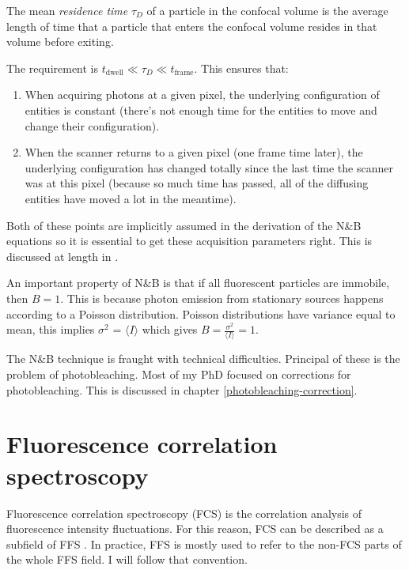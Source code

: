 \documentclass[12pt,]{book}
\providecommand{\tightlist}{%
  \setlength{\itemsep}{0pt}\setlength{\parskip}{0pt}}
\theoremstyle{definition}
\theoremstyle{definition}
\theoremstyle{definition}
\theoremstyle{remark}
\let\BeginKnitrBlock\begin \let\EndKnitrBlock\end
\begin{document}
\BeginKnitrBlock{definition}
\protect\hypertarget{def:unnamed-chunk-17}{}{\label{def:unnamed-chunk-17}
}The mean \emph{residence time} \(\tau_D\) of a particle in the confocal
volume is the average length of time that a particle that enters the
confocal volume resides in that volume before exiting.
\EndKnitrBlock{definition}

The requirement is \(t_\text{dwell} \ll \tau_D \ll t_\text{frame}\).
This ensures that:

\begin{enumerate}
\def\labelenumi{\arabic{enumi}.}
\tightlist
\item
  When acquiring photons at a given pixel, the underlying configuration
  of entities is constant (there's not enough time for the entities to
  move and change their configuration).
\item
  When the scanner returns to a given pixel (one frame time later), the
  underlying configuration has changed totally since the last time the
  scanner was at this pixel (because so much time has passed, all of the
  diffusing entities have moved a lot in the meantime).
\end{enumerate}

Both of these points are implicitly assumed in the derivation of the
N\&B equations so it is essential to get these acquisition parameters
right. This is discussed at length in \citet{NBreview}.

An important property of N\&B is that if all fluorescent particles are
immobile, then \(B = 1\). This is because photon emission from
stationary sources happens according to a Poisson distribution. Poisson
distributions have variance equal to mean, this implies \(\sigma^2\) =
\(\langle I \rangle\) which gives
\(B = \frac{\sigma^2}{\langle I \rangle} = 1\).

The N\&B technique is fraught with technical difficulties. Principal of
these is the problem of photobleaching. Most of my PhD focused on
corrections for photobleaching. This is discussed in chapter
\ref{photobleaching-correction}.

\section{Fluorescence correlation spectroscopy}\label{FCS}

Fluorescence correlation spectroscopy (FCS) is the correlation analysis
of fluorescence intensity fluctuations. For this reason, FCS can be
described as a subfield of FFS \citep{FFSnewage}. In practice, FFS is
mostly used to refer to the non-FCS parts of the whole FFS field. I will
follow that convention.
\end{document}
